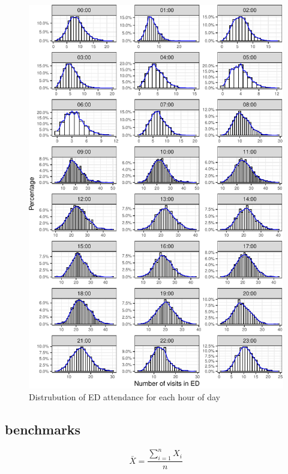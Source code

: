 \documentclass[]{elsarticle} %
\begin{document}
\begin{figure}[H]

{\centering \includegraphics{paper_files/figure-latex/24hour-1} 

}

\caption{Distrubution of ED attendance for each hour of day}\label{fig:24hour}
\end{figure}

\hypertarget{benchmarks}{%
\subsection{benchmarks}\label{benchmarks}}

\begin{equation}
\bar{X} = \frac{\sum_{i=1}^n X_i}{n} \label{eq:mean}
\end{equation}
\end{document}

